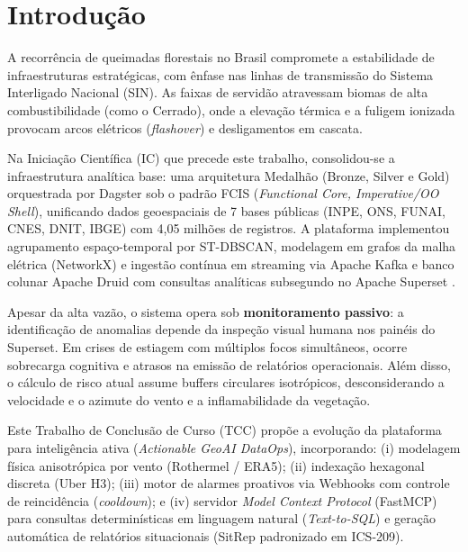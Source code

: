 \section{Introdução}
\label{sc:introducao}

A recorrência de queimadas florestais no Brasil compromete a estabilidade de infraestruturas estratégicas, com ênfase nas linhas de transmissão do Sistema Interligado Nacional (SIN). As faixas de servidão atravessam biomas de alta combustibilidade (como o Cerrado), onde a elevação térmica e a fuligem ionizada provocam arcos elétricos (\textit{flashover}) e desligamentos em cascata.

Na Iniciação Científica (IC) que precede este trabalho, consolidou-se a infraestrutura analítica base: uma arquitetura Medalhão (Bronze, Silver e Gold) orquestrada por Dagster sob o padrão FCIS (\textit{Functional Core, Imperative/OO Shell}), unificando dados geoespaciais de 7 bases públicas (INPE, ONS, FUNAI, CNES, DNIT, IBGE) com 4,05 milhões de registros. A plataforma implementou agrupamento espaço-temporal por ST-DBSCAN, modelagem em grafos da malha elétrica (NetworkX) e ingestão contínua em streaming via Apache Kafka e banco colunar Apache Druid com consultas analíticas subsegundo no Apache Superset \cite{yang2014druid}.

Apesar da alta vazão, o sistema opera sob \textbf{monitoramento passivo}: a identificação de anomalias depende da inspeção visual humana nos painéis do Superset. Em crises de estiagem com múltiplos focos simultâneos, ocorre sobrecarga cognitiva \cite{endsley1995toward} e atrasos na emissão de relatórios operacionais. Além disso, o cálculo de risco atual assume buffers circulares isotrópicos, desconsiderando a velocidade e o azimute do vento e a inflamabilidade da vegetação. 

Este Trabalho de Conclusão de Curso (TCC) propõe a evolução da plataforma para inteligência ativa (\textit{Actionable GeoAI DataOps}), incorporando: (i) modelagem física anisotrópica por vento (Rothermel / ERA5); (ii) indexação hexagonal discreta (Uber H3); (iii) motor de alarmes proativos via Webhooks com controle de reincidência (\textit{cooldown}); e (iv) servidor \textit{Model Context Protocol} (FastMCP) para consultas determinísticas em linguagem natural (\textit{Text-to-SQL}) e geração automática de relatórios situacionais (SitRep padronizado em ICS-209).
